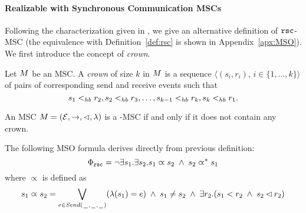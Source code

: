 \paragraph{\bf Realizable with Synchronous Communication MSCs} 

Following the characterization given in \cite[Theorem 4.4]{DBLP:journals/dc/Charron-BostMT96}, we  give an alternative definition of $\mathtt{rsc}$-MSC (the equivalence with Definition~\ref{def:rsc} is shown in Appendix~\ref{apx:MSO}). We first  introduce the concept of \emph{crown}.

\begin{definition} [crown]
	Let $M$ be an MSC. A \emph{crown} of size $k$ in $M$ is a sequence $\langle(s_i,r_i),\, i \in \{1,\dots,k\}\rangle$ of pairs of corresponding send and receive events such that
	\[
		s_1 <_{hb} r_2, s_2 <_{hb} r_3, \dots, s_{k-1} <_{hb} r_k, s_k <_{hb} r_1.
	\]
\end{definition}

\begin{definition} \label{def:rsc_alt}
	An MSC $M = (\mathcal{E},\to,\lhd,\lambda)$ is a \rsc-MSC if and only if it does not contain any crown.
\end{definition}


The following MSO formula derives directly from previous  definition:
\[\Phi_{\mathtt{rsc}} = \neg \exists s_1.\exists s_2. s_1 \varpropto s_2 \;\wedge\; s_2 \varpropto^\ast s_1
\]
\noindent where $\varpropto$ is defined as
\[
s_1 \varpropto s_2 =
\bigvee_{\substack{e \in {\mathit{Send}(\hspace{0.1em}\underline{\hspace{0.5em}}\hspace{0.1em},\hspace{0.1em}\underline{\hspace{0.5em}}\hspace{0.1em},\hspace{0.1em}\underline{\hspace{0.5em}}\hspace{0.1em})}}}(\lambda(s_1) = e) \;\wedge\;
s_1 \neq s_2 \;\wedge\;
\exists r_2. (s_1 < r_2 \;\wedge\; s_2 \lhd r_2)
\]



